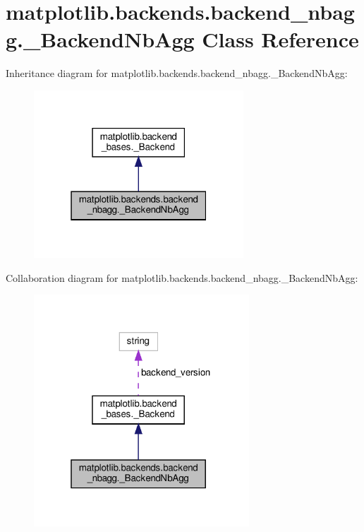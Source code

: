 \hypertarget{classmatplotlib_1_1backends_1_1backend__nbagg_1_1__BackendNbAgg}{}\section{matplotlib.\+backends.\+backend\+\_\+nbagg.\+\_\+\+Backend\+Nb\+Agg Class Reference}
\label{classmatplotlib_1_1backends_1_1backend__nbagg_1_1__BackendNbAgg}


Inheritance diagram for matplotlib.\+backends.\+backend\+\_\+nbagg.\+\_\+\+Backend\+Nb\+Agg\+:
\nopagebreak
\begin{figure}[H]
\begin{center}
\leavevmode
\includegraphics[width=223pt]{classmatplotlib_1_1backends_1_1backend__nbagg_1_1__BackendNbAgg__inherit__graph}
\end{center}
\end{figure}


Collaboration diagram for matplotlib.\+backends.\+backend\+\_\+nbagg.\+\_\+\+Backend\+Nb\+Agg\+:
\nopagebreak
\begin{figure}[H]
\begin{center}
\leavevmode
\includegraphics[width=229pt]{classmatplotlib_1_1backends_1_1backend__nbagg_1_1__BackendNbAgg__coll__graph}
\end{center}
\end{figure}
